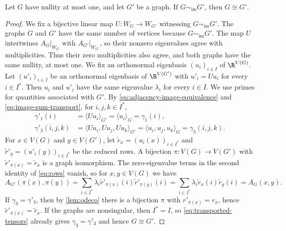 \begin{lemma}\label{lem:reconstruction}
 Let $G$ have nullity at most one, and let $G'$ be a graph.
 If $G\sim_{\mathrm{im}}G'$, then $G\cong G'$.
\end{lemma}
\begin{proof}
  We fix a bijective linear map $U:W_G\to W_{G'}$ witnessing
  $G\sim_{\mathrm{im}}G'$.
  The graphs $G$ and $G'$ have the same number of vertices because
  $G\sim_{\mathrm{im}}G'$. The map $U$ intertwines
  $A_G|_{W_G}$ with $A_{G'}|_{W_{G'}}$, so their nonzero eigenvalues agree
  with multiplicities. Thus their zero multiplicities also agree,
  and both graphs have the same nullity, at most one.
  We fix an orthonormal eigenbasis
  $(u_i)_{i\in I}$ of $\R^{V(G)}$.
  Let $(u'_i)_{i\in I}$ be an orthonormal eigenbasis of $\R^{V(G')}$
  with $u'_i=Uu_i$ for every $i\in I^*$.
  Then $u_i$ and $u'_i$ have the same eigenvalue $\lambda_i$ for every
  $i\in I$. We use primes for quantities associated with $G'$.
  By \cref{eq:adjacency-image-equivalence} and
  \cref{eq:image-sum-transport}, for $i,j,k\in I^*$,
  \begin{equation}\label{eq:transported-tensors}
    \begin{aligned}
      \gamma'_1(i)&=\langle Uu_i\rangle_{G'}
        =\langle u_i\rangle_G=\gamma_1(i),\\
      \gamma'_3(i,j,k)&=\langle Uu_i,Uu_j,Uu_k\rangle_{G'}
        =\langle u_i,u_j,u_k\rangle_G=\gamma_3(i,j,k).
    \end{aligned}
  \end{equation}
  For $x\in V(G)$ and $y\in V(G')$, let
  $\tilde{r}_x=(u_i(x))_{i\in I^*}$ and
  $\tilde{r}'_y=(u'_i(y))_{i\in I^*}$ be the reduced rows.
  A bijection $\pi:V(G)\to V(G')$ with $\tilde{r}'_{\pi(x)}=\tilde{r}_x$ is a
  graph isomorphism. The zero-eigenvalue terms in the second identity of
  \cref{eq:rows} vanish, so for $x,y\in V(G)$ we have
  \begin{equation}\label{eq:row-isomorphism}
    A_{G'}(\pi(x),\pi(y))
    =\sum_{i\in I^*}\lambda_i\tilde{r}'_{\pi(x)}(i)\tilde{r}'_{\pi(y)}(i)
    =\sum_{i\in I^*}\lambda_i\tilde{r}_x(i)\tilde{r}_y(i)=A_G(x,y).
  \end{equation}
  If $\gamma_3=\gamma'_3$, then by \cref{lem:odeco} there is a
  bijection $\pi$ with $r'_{\pi(x)}=r_x$, hence $\tilde{r}'_{\pi(x)}=\tilde{r}_x$.
  If the graphs are nonsingular, then $I^*=I$, so
  \cref{eq:transported-tensors} already gives $\gamma_3=\gamma'_3$
  and hence $G\cong G'$.


\end{proof}

